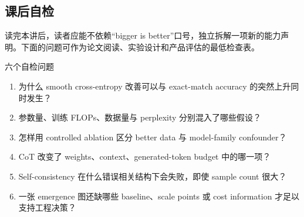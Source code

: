 \documentclass[a4paper]{article}
\begin{document}
\subsection{课后自检}

读完本讲后，读者应能不依赖“bigger is better”口号，独立拆解一项新的能力声明。下面的问题可作为论文阅读、实验设计和产品评估的最低检查表。

\begin{importantbox}{六个自检问题}
\begin{enumerate}
  \item 为什么 smooth cross-entropy 改善可以与 exact-match accuracy 的突然上升同时发生？
  \item 参数量、训练 FLOPs、数据量与 perplexity 分别混入了哪些假设？
  \item 怎样用 controlled ablation 区分 better data 与 model-family confounder？
  \item CoT 改变了 weights、context、generated-token budget 中的哪一项？
  \item Self-consistency 在什么错误相关结构下会失败，即使 sample count 很大？
  \item 一张 emergence 图还缺哪些 baseline、scale points 或 cost information 才足以支持工程决策？
\end{enumerate}
\end{importantbox}
\end{document}
